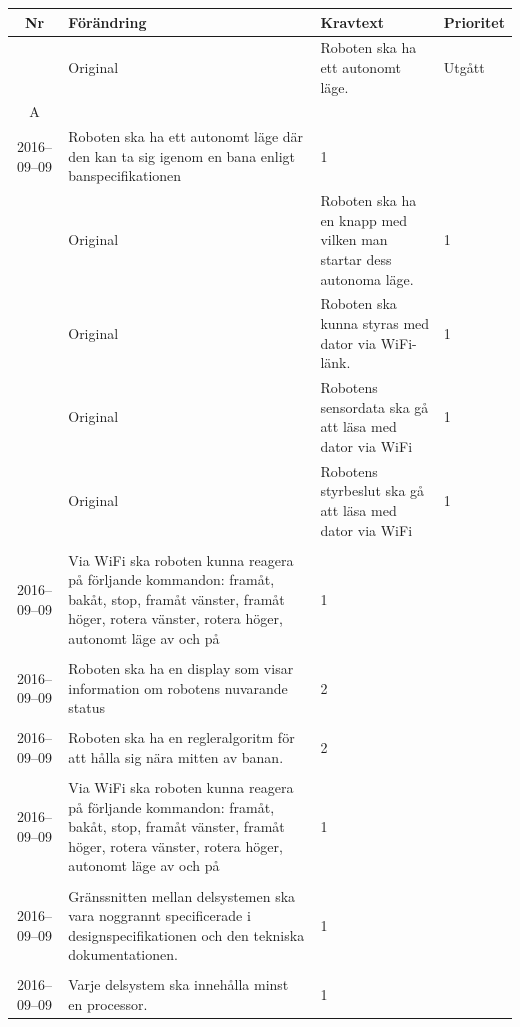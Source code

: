 \documentclass[a4paper,titlepage,12pt]{article}
\newcounter{reqNr}
\newcommand{\nextReqNr}{\stepcounter{reqNr}\arabic{reqNr}}
\newcounter{reqNrII}
\newcommand{\nextReqNrII}{\stepcounter{reqNrII}\arabic{reqNrII}}
\newcommand{\newContent}[1] {\pbox{5cm}{Nytt innehåll i \arabic{reqNr}\\#1}}
\newcommand{\newRequirement}[1] {\pbox{5cm}{Tillagt \\#1}}
\begin{document}
		\begin{longtable}[c]{ c l>{\raggedright}p{} l }
			\textbf{Nr} & \textbf{Förändring} & \textbf{Kravtext} & \textbf{Prioritet} 
				\\ \midrule
			\nextReqNr{} & Original & Roboten ska ha ett autonomt läge. & Utgått
					\\ \midrule
	
			\arabic{reqNr}A & \newContent{2016--09--09} & Roboten ska ha ett autonomt läge där den kan ta
					sig igenom en bana enligt banspecifikationen & 1
					\\ \midrule

			\nextReqNr{} & Original & Roboten ska ha en knapp med vilken man startar 
				dess autonoma läge. & 1
				\\ \midrule

			\nextReqNr{} & Original & Roboten ska kunna styras med dator 
				via WiFi-länk. & 1
				\\ \midrule
		
			\nextReqNr{} & Original & Robotens sensordata ska gå att läsa 
				med dator via WiFi & 1
				\\ \midrule

			\nextReqNr{} & Original & Robotens styrbeslut ska gå att läsa 
				med dator via WiFi & 1
                \\ \midrule
      
			\nextReqNrII{} & \newRequirement{2016--09--09} & Via WiFi ska roboten kunna reagera på förljande
				kommandon: framåt, bakåt, stop, framåt vänster,
				framåt höger, rotera vänster, rotera höger,
				autonomt läge av och på & 1
				\\ \midrule

			\nextReqNrII{} & \newRequirement{2016--09--09} & Roboten ska ha en display som visar information
				om robotens nuvarande status & 2
				\\ \midrule

			\nextReqNrII{} & \newRequirement{2016--09--09} & Roboten ska ha en regleralgoritm för att hålla sig
				nära mitten av banan. & 2
				\\ \midrule

			\nextReqNrII{} & \newRequirement{2016--09--09} & Via WiFi ska roboten kunna reagera på förljande
                              kommandon: framåt, bakåt, stop, framåt vänster,
                              framåt höger, rotera vänster, rotera höger,
                              autonomt läge av och på & 1
                \\ \midrule

            \nextReqNrII{} & \newRequirement{2016--09--09} & Gränssnitten
            mellan delsystemen ska vara noggrannt specificerade i
            designspecifikationen och den tekniska dokumentationen. & 1
                \\ \midrule

            \nextReqNrII{} & \newRequirement{2016--09--09} & Varje delsystem
            ska innehålla minst en processor. & 1
				\\ 
		\end{longtable}
\end{document}
